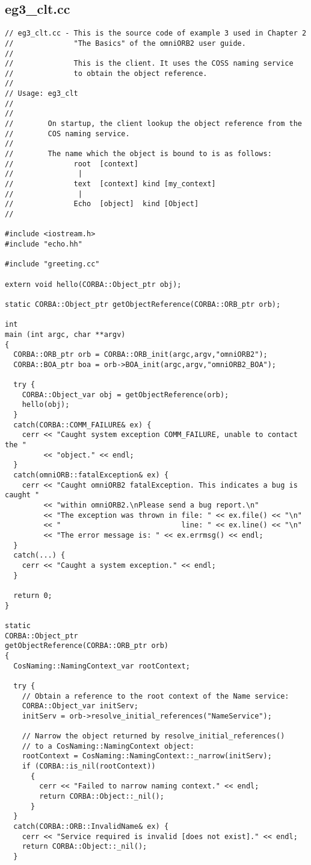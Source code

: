 \documentclass[11pt,twoside,onecolumn]{book}
\begin{document}
{\subsection{eg3\_clt.cc}
\begin{verbatim}
// eg3_clt.cc - This is the source code of example 3 used in Chapter 2
//              "The Basics" of the omniORB2 user guide.
//
//              This is the client. It uses the COSS naming service
//              to obtain the object reference.
//
// Usage: eg3_clt
//
//
//        On startup, the client lookup the object reference from the
//        COS naming service.
//
//        The name which the object is bound to is as follows:
//              root  [context]
//               |
//              text  [context] kind [my_context]
//               |
//              Echo  [object]  kind [Object]
//

#include <iostream.h>
#include "echo.hh"

#include "greeting.cc"

extern void hello(CORBA::Object_ptr obj);

static CORBA::Object_ptr getObjectReference(CORBA::ORB_ptr orb);

int
main (int argc, char **argv) 
{
  CORBA::ORB_ptr orb = CORBA::ORB_init(argc,argv,"omniORB2");
  CORBA::BOA_ptr boa = orb->BOA_init(argc,argv,"omniORB2_BOA");

  try {
    CORBA::Object_var obj = getObjectReference(orb);
    hello(obj);
  }
  catch(CORBA::COMM_FAILURE& ex) {
    cerr << "Caught system exception COMM_FAILURE, unable to contact the "
         << "object." << endl;
  }
  catch(omniORB::fatalException& ex) {
    cerr << "Caught omniORB2 fatalException. This indicates a bug is caught "
         << "within omniORB2.\nPlease send a bug report.\n"
         << "The exception was thrown in file: " << ex.file() << "\n"
         << "                            line: " << ex.line() << "\n"
         << "The error message is: " << ex.errmsg() << endl;
  }
  catch(...) {
    cerr << "Caught a system exception." << endl;
  }

  return 0;
}

static 
CORBA::Object_ptr
getObjectReference(CORBA::ORB_ptr orb)
{
  CosNaming::NamingContext_var rootContext;
  
  try {
    // Obtain a reference to the root context of the Name service:
    CORBA::Object_var initServ;
    initServ = orb->resolve_initial_references("NameService");

    // Narrow the object returned by resolve_initial_references()
    // to a CosNaming::NamingContext object:
    rootContext = CosNaming::NamingContext::_narrow(initServ);
    if (CORBA::is_nil(rootContext)) 
      {
        cerr << "Failed to narrow naming context." << endl;
        return CORBA::Object::_nil();
      }
  }
  catch(CORBA::ORB::InvalidName& ex) {
    cerr << "Service required is invalid [does not exist]." << endl;
    return CORBA::Object::_nil();
  }



\end{verbatim}}
\end{document}
